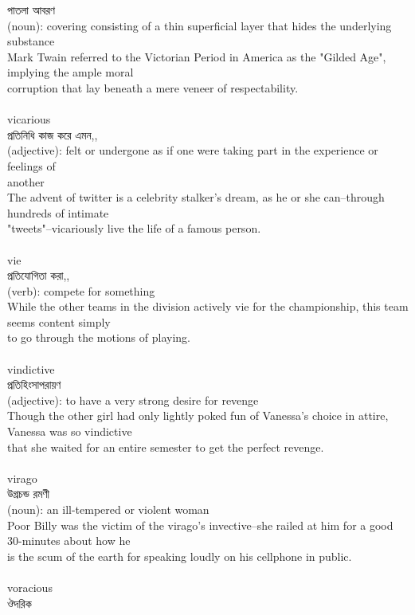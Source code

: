 \documentclass{article}
\begin{document}
{পাতলা আবরণ}\\
{(noun): covering consisting of a thin superficial layer that hides the underlying substance\\Mark Twain referred to the Victorian Period in America as the "Gilded Age", implying the ample moral\\corruption that lay beneath a mere veneer of respectability.\\}\\
{vicarious}\\
{প্রতিনিধি কাজ করে এমন,,}\\
{(adjective): felt or undergone as if one were taking part in the experience or feelings of\\another\\The advent of twitter is a celebrity stalker's dream, as he or she can--through hundreds of intimate\\"tweets"--vicariously live the life of a famous person.\\}\\
{vie}\\
{প্রতিযোগিতা করা,,}\\
{(verb): compete for something\\While the other teams in the division actively vie for the championship, this team seems content simply\\to go through the motions of playing.\\}\\
{vindictive}\\
{প্রতিহিংসাপরায়ণ}\\
{(adjective): to have a very strong desire for revenge\\Though the other girl had only lightly poked fun of Vanessa's choice in attire, Vanessa was so vindictive\\that she waited for an entire semester to get the perfect revenge.\\}\\
{virago}\\
{উগ্রচন্ড রমণী}\\
{(noun): an ill-tempered or violent woman\\Poor Billy was the victim of the virago's invective--she railed at him for a good 30-minutes about how he\\is the scum of the earth for speaking loudly on his cellphone in public.\\}\\
{voracious}\\
{ঔদরিক}\\
\end{document}
